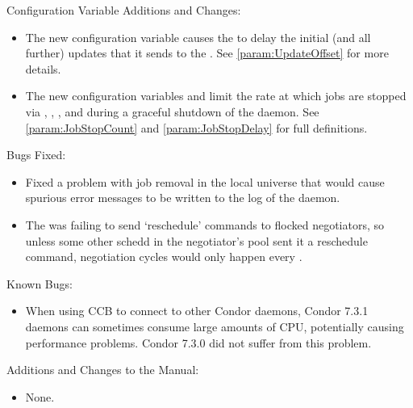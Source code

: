 \noindent Configuration Variable Additions and Changes:

\begin{itemize}

\item The new configuration variable  
  causes the  to
  delay the initial (and all further) updates that it sends to the
  .  See \ref{param:UpdateOffset} for more details.

\item The new configuration variables
   and 
  limit the rate at which jobs are stopped via ,
  , , and during a graceful shutdown of
  the  daemon.
  See \ref{param:JobStopCount} and \ref{param:JobStopDelay} 
  for full definitions.

\end{itemize}

\noindent Bugs Fixed:

\begin{itemize}

\item Fixed a problem with job removal in the local universe that 
  would cause spurious error messages to be written to the log of the
   daemon.

\item The  was failing to send `reschedule' commands to
flocked negotiators, so unless some other schedd in the negotiator's
pool sent it a reschedule command, negotiation cycles would only
happen every .

\end{itemize}

\noindent Known Bugs:

\begin{itemize}

\item When using CCB to connect to other Condor daemons, Condor 7.3.1
daemons can sometimes consume large amounts of CPU, potentially
causing performance problems.  Condor 7.3.0 did not suffer from this
problem.

\end{itemize}

\noindent Additions and Changes to the Manual:

\begin{itemize}

\item None.

\end{itemize}

